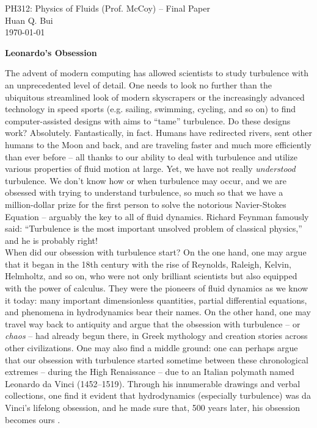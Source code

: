 \documentclass[12pt]{article}
\begin{document}
\begin{framed}
\begin{center}
{\large PH312: Physics of Fluids (Prof. McCoy) -- Final Paper}\\
{ Huan Q. Bui}\\
\today
\end{center}
\end{framed}



\begin{center}
	\Large{\textbf{Leonardo's Obsession}}
\end{center}



The advent of modern computing has allowed scientists to study turbulence with an unprecedented level of detail. One needs to look no further than the ubiquitous streamlined look of modern skyscrapers or the increasingly advanced technology in speed sports (e.g. sailing, swimming, cycling, and so on) to find computer-assisted designs with aims to ``tame'' turbulence. Do these designs work? Absolutely. Fantastically, in fact. Humans have redirected rivers, sent other humans to the Moon and back, and are traveling faster and much more efficiently than ever before -- all thanks to our ability to deal with turbulence and utilize various properties of fluid motion at large. Yet, we have not really \textit{understood} turbulence. We don't know how or when turbulence may occur, and we are obsessed with trying to understand turbulence, so much so that we have a million-dollar prize for the first person to solve the notorious Navier-Stokes Equation -- arguably the key to all of fluid dynamics. Richard Feynman famously said: ``Turbulence is the most important unsolved problem of classical physics,'' and he is probably right!  \\

When did our obsession with turbulence start? On the one hand, one may argue that it began in the 18th century with the rise of Reynolds, Raleigh, Kelvin, Helmholtz, and so on, who were not only brilliant scientists but also equipped with the power of calculus. They were the pioneers of fluid dynamics as we know it today: many important dimensionless quantities, partial differential equations, and phenomena in hydrodynamics bear their names.  On the other hand, one may travel way back to antiquity and argue that the obsession with turbulence -- or \textit{chaos} -- had already begun there, in Greek mythology and creation stories across other civilizations. One may also find a middle ground: one can perhaps argue that our obsession with turbulence started sometime between these chronological extremes -- during the High Renaissance -- due to an Italian polymath named Leonardo da Vinci (1452–1519). Through his innumerable drawings and verbal collections, one find it evident that hydrodynamics (especially turbulence) was da Vinci's lifelong obsession, and he made sure that, 500 years later, his obsession becomes ours \cite{lavin1993leonardo}. \\
\end{document}
